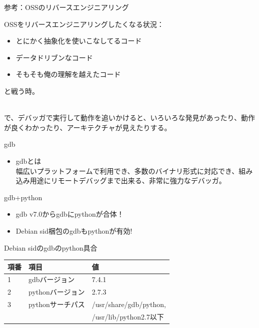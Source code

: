 \begin{frame}{参考：OSSのリバースエンジニアリング}

OSSをリバースエンジニアリングしたくなる状況：

\begin{itemize}
 \item とにかく抽象化を使いこなしてるコード
 \item データドリブンなコード
 \item そもそも俺の理解を越えたコード
\end{itemize}

と戦う時。

\\

 で、デバッガで実行して動作を追いかけると、いろいろな発見があったり、動作が良くわかったり、アーキテクチャが見えたりする。
\end{frame}

\begin{frame}{gdb}

\Large
\begin{itemize}
 \item  gdbとは \\
幅広いプラットフォームで利用でき、多数のバイナリ形式に対応でき、組み込み用途にリモートデバッグまで出来る、非常に強力なデバッガ。
\end{itemize}

\end{frame}

\begin{frame}{gdb+python}
\Large
\begin{itemize}
\item gdb v7.0からgdbにpythonが合体！
\item Debian sid梱包のgdbもpythonが有効!
\end{itemize}


\end{frame}

\begin{frame}{Debian sidのgdbのpython具合}

\begin{table}[ht]
\begin{center}
\small
\begin{tabular}{|l|l|l|}
\hline
項番 & 項目 & 値 \\
\hline
1 & gdbバージョン & 7.4.1 \\
2 & pythonバージョン & 2.7.3 \\
3 & pythonサーチパス & /usr/share/gdb/python,\\
 & &/usr/lib/python2.7以下 \\
\hline
\end{tabular}
\end{center}
\end{table}

\end{frame}

